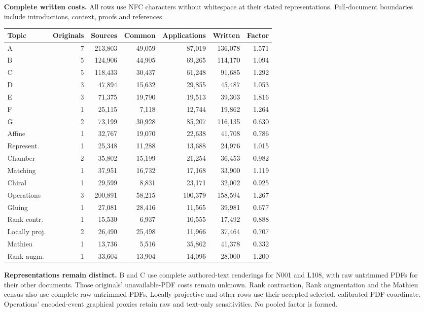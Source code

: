 \documentclass[11pt,a4paper]{article}
\newcommand{\tabsetup}{\small\setlength{\tabcolsep}{4pt}\renewcommand{\arraystretch}{1.10}}
\begin{document}
\textbf{Complete written costs.} All rows use NFC characters without whitespace at their stated representations. Full-document boundaries include introductions, context, proofs and references.
\begin{center}\tabsetup\begin{tabular}{lrrrrrr}\toprule
Topic & Originals & Sources & Common & Applications & Written & Factor\\\midrule
A & 7 & 213,803 & 49,059 & 87,019 & 136,078 & 1.571 \\
B & 5 & 124,906 & 44,905 & 69,265 & 114,170 & 1.094 \\
C & 5 & 118,433 & 30,437 & 61,248 & 91,685 & 1.292 \\
D & 3 & 47,894 & 15,632 & 29,855 & 45,487 & 1.053 \\
E & 3 & 71,375 & 19,790 & 19,513 & 39,303 & 1.816 \\
F & 1 & 25,115 & 7,118 & 12,744 & 19,862 & 1.264 \\
G & 2 & 73,199 & 30,928 & 85,207 & 116,135 & 0.630 \\
Affine & 1 & 32,767 & 19,070 & 22,638 & 41,708 & 0.786 \\
Represent. & 1 & 25,348 & 11,288 & 13,688 & 24,976 & 1.015 \\
Chamber & 2 & 35,802 & 15,199 & 21,254 & 36,453 & 0.982 \\
Matching & 1 & 37,951 & 16,732 & 17,168 & 33,900 & 1.119 \\
Chiral & 1 & 29,599 & 8,831 & 23,171 & 32,002 & 0.925 \\
Operations & 3 & 200,891 & 58,215 & 100,379 & 158,594 & 1.267 \\
Gluing & 1 & 27,081 & 28,416 & 11,565 & 39,981 & 0.677 \\
Rank contr. & 1 & 15,530 & 6,937 & 10,555 & 17,492 & 0.888 \\
Locally proj. & 2 & 26,490 & 25,498 & 11,966 & 37,464 & 0.707 \\
Mathieu & 1 & 13,736 & 5,516 & 35,862 & 41,378 & 0.332 \\
Rank augm. & 1 & 33,604 & 13,904 & 14,096 & 28,000 & 1.200 \\
\bottomrule\end{tabular}\end{center}
\textbf{Representations remain distinct.} B and C use complete authored-text renderings for N001 and L108, with raw untrimmed PDFs for their other documents. Those originals' unavailable-PDF costs remain unknown. Rank contraction, Rank augmentation and the Mathieu census also use complete raw untrimmed PDFs. Locally projective and other rows use their accepted selected, calibrated PDF coordinate. Operations' encoded-event graphical proxies retain raw and text-only sensitivities. No pooled factor is formed.
\end{document}
